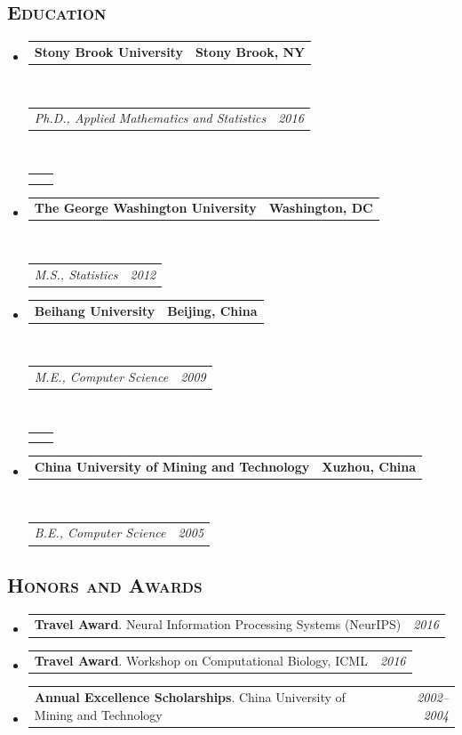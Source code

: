 \documentclass[12pt, letterpaper]{article}
\makeatletter
\newcommand{\headerrow}[2]
{\begin{tabular*}{\linewidth}{l@{\extracolsep{\fill}}r}
	#1 &
	#2 \\
\end{tabular*}}
\makeatother
\begin{document}
\subsection*{\textsc{Education}}
\begin{itemize}
	\parskip=0.1em
    
  	\item 
	\headerrow
		{\textbf{Stony Brook University}}
		{\textbf{Stony Brook, NY}}
	\\
	\headerrow
		{\emph{Ph.D., Applied Mathematics and Statistics}}
		{\emph{2016}}
		\\
	\headerrow
	{
	\quad {\small Thesis: Log-linear Model Based Tree and Latent Variable Model for Count Data}
	\\ 
	\quad {\small Advisors: Dr. Hongshik Ahn and Dr. Il Memming Park}
	}
	{}
	\item 
	\headerrow
		{\textbf{The George Washington University}}
		{\textbf{Washington, DC}}
	\\
	\headerrow
		{\emph{M.S., Statistics}}
		{\emph{2012}}
			\item 
	\headerrow
		{\textbf{Beihang University}}
		{\textbf{Beijing, China}}
	\\
	\headerrow
		{\emph{M.E., Computer Science}}
		{\emph{2009}}
    \\
    \headerrow
    {
        \quad {\small Thesis: A Study on Network Traffic Models}
        \\ 
        \quad {\small Advisors: Dr. Qinghua Cao}
    }
    {}
	\item 
	\headerrow
		{\textbf{China University of Mining and Technology}}
		{\textbf{Xuzhou, China}}
	\\
	\headerrow
		{\emph{B.E., Computer Science}}
		{\emph{2005}}
		\end{itemize}


\subsection*{\textsc{Honors and Awards}}
\begin{itemize}
    \parskip=0.1em
    
        \item
    \headerrow
    {\textbf{Travel Award}. Neural Information Processing Systems (NeurIPS)}
    {\emph{2016}}
        \item
    \headerrow
    {\textbf{Travel Award}. Workshop on Computational Biology, ICML}
    {\emph{2016}}
        \item
    \headerrow
    {\textbf{Annual Excellence Scholarships}. China University of Mining and Technology}
    {\emph{2002--2004}}
\end{itemize}
\end{document}
